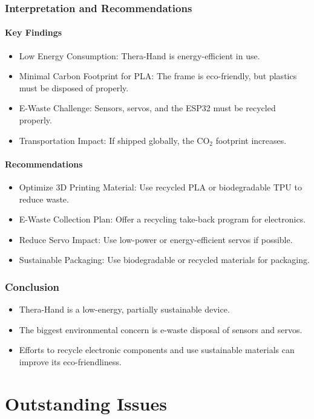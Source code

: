 \documentclass{article}
\begin{document}
\subsubsection{Interpretation and Recommendations}
\paragraph{Key Findings}
\begin{itemize}
    \item Low Energy Consumption: Thera-Hand is energy-efficient in use.
    \item Minimal Carbon Footprint for PLA: The frame is eco-friendly, but plastics must be disposed
of properly.
    \item E-Waste Challenge: Sensors, servos, and the ESP32 must be recycled properly.
    \item Transportation Impact: If shipped globally, the CO$_2$ footprint increases.
\end{itemize}
\paragraph{Recommendations}
\begin{itemize}
    \item Optimize 3D Printing Material: Use recycled PLA or biodegradable TPU to reduce waste.
    \item E-Waste Collection Plan: Offer a recycling take-back program for electronics.
    \item Reduce Servo Impact: Use low-power or energy-efficient servos if possible.
    \item Sustainable Packaging: Use biodegradable or recycled materials for packaging.
\end{itemize}

\subsubsection{Conclusion}
\begin{itemize}
\item Thera-Hand is a low-energy, partially sustainable device.
\item The biggest environmental concern is e-waste disposal of sensors and servos.
\item Efforts to recycle electronic components and use sustainable materials can improve its
eco-friendliness.
\end{itemize}

\section{Outstanding Issues}
\end{document}
